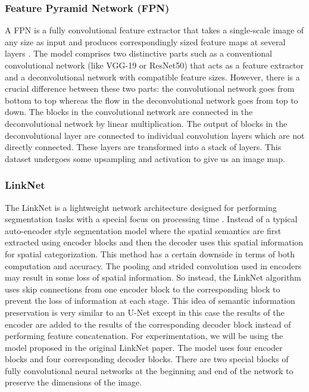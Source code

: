 \documentclass[a4paper,12pt]{spieman}  %
\begin{document}
\begin{spacing}{1}
\subsubsection{Feature Pyramid Network (FPN)}
A FPN is a fully convolutional feature extractor that takes a single-scale image of any size as input and produces correspondingly sized feature maps at several layers \citep{lin2017feature}. The model comprises two distinctive parts  such as  a conventional convolutional network (like VGG-19 or ResNet50) that acts as a feature extractor and a deconvolutional network with compatible feature sizes. However, there is a crucial difference between these two parts: the convolutional network goes from bottom to top whereas the flow in the deconvolutional network goes from top to down. The blocks in the convolutional network are connected in the deconvolutional network by linear multiplication. The output of blocks in the deconvolutional layer are connected to individual convolution layers which are not directly connected. These layers are transformed into a stack of layers. This dataset undergoes some upsampling and activation to give us an image map.
\subsubsection{LinkNet}
The LinkNet is a lightweight network architecture designed for performing segmentation tasks with a special focus on processing time \citep{chaurasia2017linknet}. Instead of a typical auto-encoder style segmentation model where the spatial semantics are first extracted using encoder blocks and then the decoder uses this spatial information for spatial categorization. This method has a certain downside in terms of both computation and accuracy. The pooling and strided convolution used in encoders may result in some loss of spatial information. So instead, the LinkNet algorithm uses skip connections from one encoder block to the corresponding block to prevent the loss of information at each stage. This idea of semantic information preservation is very similar to an U-Net except in this case the results of the encoder are added to the results of the corresponding decoder block instead of performing feature concatenation.
For experimentation, we will be using the model proposed in the original LinkNet paper. The model uses four encoder blocks and four corresponding decoder blocks. There are two special blocks of fully convolutional neural networks at the beginning and end of the network to preserve the dimensions of the image.

\end{spacing}
\end{document}
